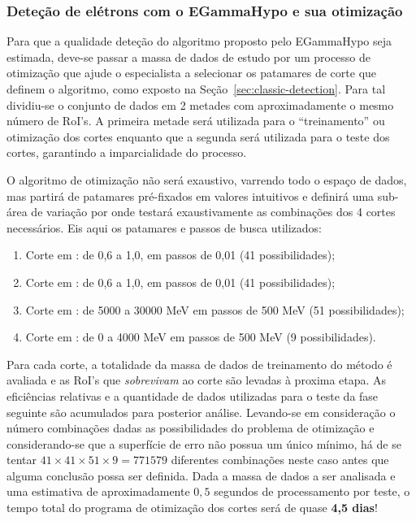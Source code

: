 \subsubsection{Deteção de elétrons com o EGammaHypo e sua otimização}

Para que a qualidade deteção do algoritmo proposto pelo EGammaHypo seja
estimada, deve-se passar a massa de dados de estudo por um processo de
otimização que ajude o especialista a selecionar os patamares de corte que
definem o algoritmo, como exposto na Seção~\ref{sec:classic-detection}. Para
tal dividiu-se o conjunto de dados em 2 metades com aproximadamente o mesmo
número de RoI's. A primeira metade será utilizada para o ``treinamento'' ou
otimização dos cortes enquanto que a segunda será utilizada para o teste dos
cortes, garantindo a imparcialidade do processo.

O algoritmo de otimização não será exaustivo, varrendo todo o espaço de dados,
mas partirá de patamares pré-fixados em valores intuitivos e definirá uma
sub-área de variação por onde testará exaustivamente as combinações dos 4
cortes necessários. Eis aqui os patamares e passos de busca utilizados:

\begin{enumerate}
\item Corte em \rcore: de 0,6 a 1,0, em passos de 0,01 (41 possibilidades);
\item Corte em \eratio: de 0,6 a 1,0, em passos de 0,01 (41 possibilidades);
\item Corte em \etem: de 5000 a 30000 MeV em passos de 500 MeV (51
possibilidades);
\item Corte em \ethad: de 0 a 4000 MeV em passos de 500 MeV (9
possibilidades). 
\end{enumerate}

Para cada corte, a totalidade da massa de dados de treinamento do método é
avaliada e as RoI's que \textit{sobrevivam} ao corte são levadas à proxima
etapa. As eficiências relativas e a quantidade de dados utilizadas para o teste
da fase seguinte são acumulados para posterior análise. Levando-se em
consideração o número combinações dadas as possibilidades do problema de
otimização e considerando-se que a superfície de erro não possua um único
mínimo, há de se tentar $41 \times 41 \times 51 \times 9 = 771579$ diferentes
combinações neste caso antes que alguma conclusão possa ser definida. Dada a
massa de dados a ser analisada e uma estimativa de aproximadamente $0,5$
segundos de processamento por teste, o tempo total do programa de otimização
dos cortes será de quase \textbf{4,5 dias}!

